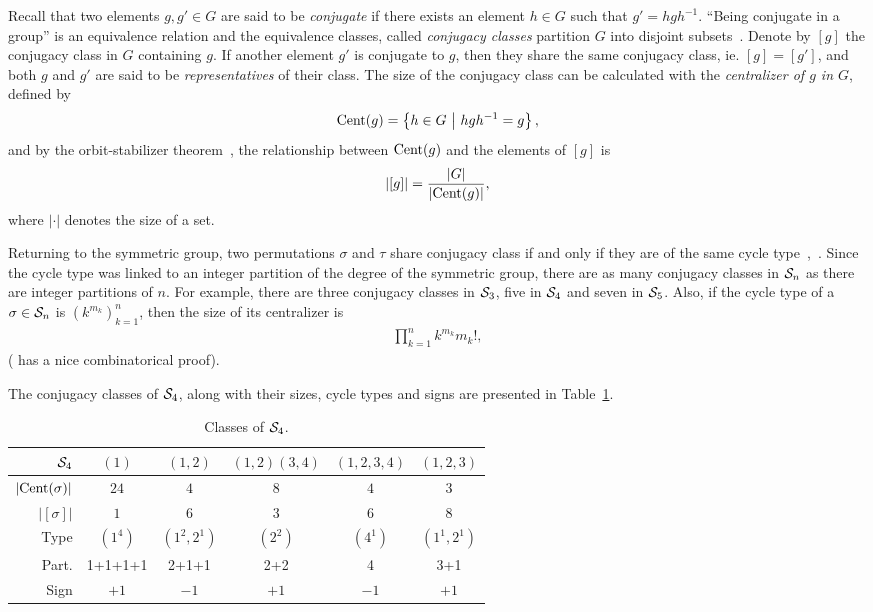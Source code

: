 Recall that two elements $g, g' \in G$ are said to be \textit{conjugate} if there exists an element $h \in G$ such that $g' = hgh^{-1}$. ``Being conjugate in a group'' is an equivalence relation and the equivalence classes, called \textit{conjugacy classes} partition $G$ into disjoint subsets~\cite[Sect.1.1.]{Sagan}. Denote by $[g]$ the conjugacy class in $G$ containing $g$. If another element $g'$ is conjugate to $g$, then they share the same conjugacy class, ie. $[g] = [g']$, and both $g$ and $g'$ are said to be \textit{representatives} of their class. The size of the conjugacy class can be calculated with the \textit{centralizer of $g$ in $G$}, defined by
\begin{align*}
	\text{Cent}(g) = \left\lbrace h \in G \ \middle\vert \ hgh^{-1} = g \right\rbrace,
\end{align*}
and by the orbit-stabilizer theorem~\cite[Thm.21.3]{Biggs}, the relationship between $\text{Cent}(g)$ and the elements of $[g]$ is 
\begin{align*}
	|[g]| = \frac{|G|}{|\text{Cent}(g)|},
\end{align*}
where $| \cdot |$ denotes the size of a set.

Returning to the symmetric group, two permutations $\sigma$ and $\tau$ share conjugacy class if and only if they are of the same cycle type~\cite[Sect.1.1.]{Sagan},~\cite[Thm.12.5.]{Biggs}. Since the cycle type was linked to an integer partition of the degree of the symmetric group, there are as many conjugacy classes in $\mathcal{S}_n$ as there are integer partitions of $n$. For example, there are three conjugacy classes in $\mathcal{S}_3$, five in $\Sym_4$ and seven in $\mathcal{S}_5$. Also, if the cycle type of a $\sigma \in \mathcal{S}_n$ is $(k^{m_k})_{k=1}^n$, then the size of its centralizer is 
\begin{align*}
	\prod_{k=1}^{n} k^{m_k} m_k!,
\end{align*}
(\cite[Prop.1.1.1.]{Sagan} has a nice combinatorical proof).

\begin{example}[$\Sym_4$]
	The conjugacy classes of $\Sym_4$, along with their sizes, cycle types and signs are presented in Table~\ref{table:elementsSym4}.
	\begin{table}[hbt!]
		\centering
		\begin{tabular}{r | c c c c c}
			         $\Sym_4$ & $(1)$   & $(1,2)$     & $(1,2)(3,4)$ & $(1,2,3,4)$ & $(1,2,3)$   \\ \hline
			$|\text{Cent}(\sigma)|$ & $24$    & $4$         & $8$          & $4$         & $3$         \\
			     $|[\sigma]|$ & $1$     & $6$         & $3$          & $6$         & $8$         \\
			             Type & $(1^4)$ & $(1^2,2^1)$ & $(2^2)$      & $(4^1)$     & $(1^1,2^1)$ \\
			            Part. & 1+1+1+1 & 2+1+1       & 2+2          & 4           & 3+1         \\
			             Sign & $+1$    & $-1$        & $+1$         & $-1$& $+1$        
		\end{tabular}
		\caption{Classes of $\Sym_4$.}
		\label{table:elementsSym4}
	\end{table}
\end{example}


